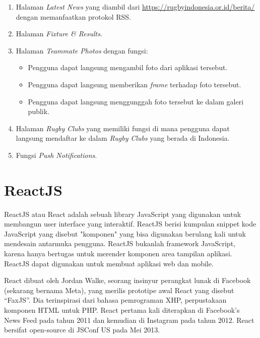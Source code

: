     \begin{enumerate}
        \item Halaman \textit{Latest News} yang diambil dari \url{https://rugbyindonesia.or.id/berita/} dengan memanfaatkan protokol RSS.
        \item Halaman \textit{Fixture \& Results}.
        \item Halaman \textit{Teammate Photos} dengan fungsi:
        \begin{itemize}
            \item Pengguna dapat langsung mengambil foto dari aplikasi tersebut.
            \item Pengguna dapat langsung memberikan \textit{frame} terhadap foto tersebut.
            \item Pengguna dapat langsung menggunggah foto tersebut ke dalam galeri publik.
        \end{itemize}
    \item Halaman \textit{Rugby Clubs} yang memiliki fungsi di mana pengguna dapat langsung mendaftar ke dalam \textit{Rugby Clubs} yang berada di Indonesia.
    \item Fungsi \textit{Push Notifications}.
    \end{enumerate}


\section{ReactJS}
\label{sec:latex}



ReactJS atau React adalah sebuah library JavaScript yang digunakan untuk membangun user interface yang interaktif. ReactJS berisi kumpulan snippet kode JavaScript yang disebut "komponen" yang bisa digunakan berulang kali untuk mendesain antarmuka pengguna. ReactJS bukanlah framework JavaScript, karena hanya bertugas untuk merender komponen area tampilan aplikasi. ReactJS dapat digunakan untuk membuat aplikasi web dan mobile.

React dibuat oleh Jordan Walke, seorang insinyur perangkat lunak di Facebook (sekarang bernama Meta), yang merilis prototipe awal React yang disebut ``FaxJS''. Dia terinspirasi dari bahasa pemrograman XHP, perpustakaan komponen HTML untuk PHP. React pertama kali diterapkan di Facebook's News Feed pada tahun 2011 dan kemudian di Instagram pada tahun 2012. React bersifat open-source di JSConf US pada Mei 2013.

